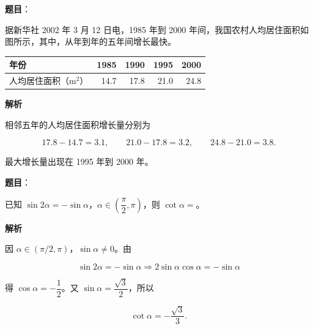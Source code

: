 \begin{answer}

\textbf{题目}：

据新华社 2002 年 3 月 12 日电，1985 年到 2000 年间，我国农村人均居住面积如图所示，其中，从\gkblank{}年到\gkblank{}年的五年间增长最快。
\nopagebreak[4]
\begin{center}\end{center}
\nopagebreak[4]
\begin{center}
\begin{tabular}{lrrrr}
\toprule
年份 & 1985 & 1990 & 1995 & 2000 \\
\midrule
人均居住面积（$\mathrm{m^2}$） & 14.7 & 17.8 & 21.0 & 24.8 \\
\bottomrule
\end{tabular}
\end{center}

\textbf{解析}

相邻五年的人均居住面积增长量分别为

\nopagebreak[4]
\[
17.8-14.7=3.1,\qquad
21.0-17.8=3.2,\qquad
24.8-21.0=3.8.
\]

最大增长量出现在 1995 年到 2000 年。


\end{answer}
\begin{answer}

\textbf{题目}：

已知 $\sin2\alpha=-\sin\alpha$，$\alpha\in\left(\dfrac\pi2,\pi\right)$，则 $\cot\alpha=$\gkblank{}。

\textbf{解析}

因 $\alpha\in(\pi/2,\pi)$，$\sin\alpha\neq0$。由

\nopagebreak[4]
\[
\sin2\alpha=-\sin\alpha
\Longrightarrow
2\sin\alpha\cos\alpha=-\sin\alpha
\]

得 $\cos\alpha=-\dfrac12$。又 $\sin\alpha=\dfrac{\sqrt3}{2}$，所以

\nopagebreak[4]
\[
\cot\alpha=-\frac{\sqrt3}{3}.
\]


\end{answer}
